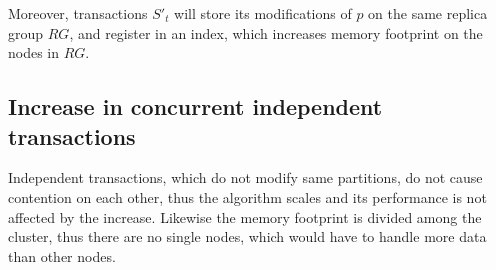 Moreover, transactions $S'_{t}$ will store its modifications of $p$ on the same replica group $RG$, and register in an index, which increases memory footprint on the nodes in $RG$.

\subsection{Increase in concurrent independent transactions}
Independent transactions, which do not modify same partitions, do not cause contention on each other, thus the algorithm scales and its performance is not affected by the increase. Likewise the memory footprint is divided among the cluster, thus there are no single nodes, which would have to handle more data than other nodes.







